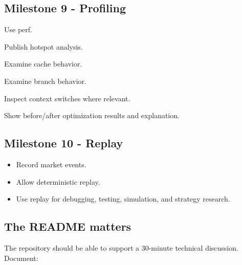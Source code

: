 \documentclass[11pt,letterpaper]{article}
\begin{document}
\subsection*{Milestone 9 - Profiling}

\begin{topics}

\item Use perf.

\item Publish hotspot analysis.

\item Examine cache behavior.

\item Examine branch behavior.

\item Inspect context switches where relevant.

\item Show before/after optimization results and explanation.

\end{topics}

\subsection*{Milestone 10 - Replay}

\begin{itemize}

\item Record market events.

\item Allow deterministic replay.

\item Use replay for debugging, testing, simulation, and strategy research.

\end{itemize}

\subsection*{The README matters}

The repository should be able to support a 30-minute technical discussion. Document:
\end{document}
